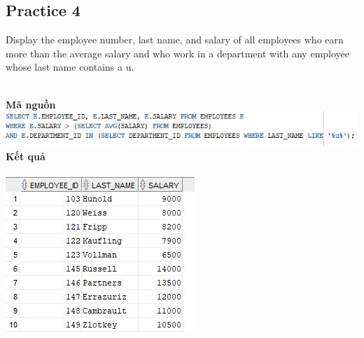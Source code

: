 \documentclass[12pt,a4paper]{report}
\begin{document}
\subsection{Practice 4}
\begin{boxedminipage}[t]{15.5cm}
	Display the employee number, last name, and salary of all employees who earn more than the average salary and 
	who work in a department with any employee whose last name contains a u.
\end{boxedminipage}
\newline
\\
\textbf{Mã nguồn}
\\
\newline
\includegraphics[scale=1]{46.jpg}\\
\textbf{Kết quả}\\\\
\includegraphics[scale=1]{k46.jpg}
\end{document}
